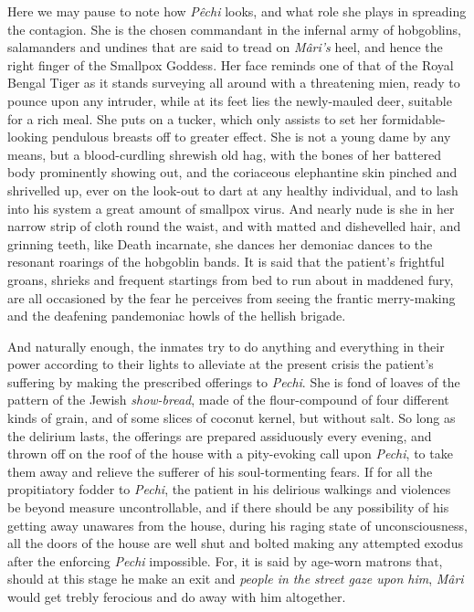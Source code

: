 \documentclass[a4paper, 12pt, oneside, english]{article}
\begin{document}
Here we may pause to note how \emph{Pêchi} looks, and what role she plays in spreading the contagion. She is the chosen commandant in the infernal army of hobgoblins, salamanders and undines that are said to tread on \emph{Mâri's} heel, and hence the right finger of the Smallpox Goddess. Her face reminds one of that of the Royal Bengal Tiger as it stands surveying all around with a threatening mien, ready to pounce upon any intruder, while at its feet lies the newly-mauled deer, suitable for a rich meal. She puts on a tucker, which only assists to set her formidable-looking pendulous breasts off to greater effect. She is not a young dame by any means, but a blood-curdling shrewish old hag, with the bones of her battered body prominently showing out, and the coriaceous elephantine skin pinched and shrivelled up, ever on the look-out to dart at any healthy individual, and to lash into his system a great amount of smallpox virus. And nearly nude is she in her narrow strip of cloth round the waist, and with matted and dishevelled hair, and grinning teeth, like Death incarnate, she dances her demoniac dances to the resonant roarings of the hobgoblin bands. It is said that the patient's frightful groans, shrieks and frequent startings from bed to run about in maddened fury, are all occasioned by the fear he perceives from seeing the frantic merry-making and the deafening pandemoniac howls of the hellish brigade.

And naturally enough, the inmates try to do anything and everything in their power according to their lights to alleviate at the present crisis the patient's suffering by making the prescribed offerings to \emph{Pechi}. She is fond of loaves of the pattern of the Jewish \emph{show-bread}, made of the flour-compound of four different kinds of grain, and of some slices of coconut kernel, but without salt. So long as the delirium lasts, the offerings are prepared assiduously every evening, and thrown off on the roof of the house with a pity-evoking call upon \emph{Pechi}, to take them away and relieve the sufferer of his soul-tormenting fears. If for all the propitiatory fodder to \emph{Pechi}, the patient in his delirious walkings and violences be beyond measure uncontrollable, and if there should be any possibility of his getting away unawares from the house, during his raging state of unconsciousness, all the doors of the house are well shut and bolted making any attempted exodus after the enforcing \emph{Pechi} impossible. For, it is said by age-worn matrons that, should at this stage he make an exit and \emph{people in the street gaze upon him}, \emph{Mâri} would get trebly ferocious and do away with him altogether.
\end{document}
